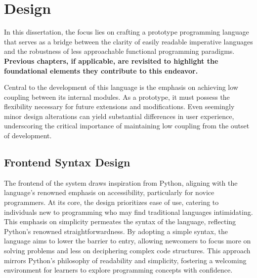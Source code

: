 \documentclass{l4proj}
\begin{document}

\chapter{Design}


In this dissertation, the focus lies on crafting a prototype programming language that serves as a bridge between the clarity of easily readable imperative languages and the robustness of less approachable functional programming paradigms.
\textbf{Previous chapters, if applicable, are revisited to highlight the foundational elements they contribute to this endeavor.}

Central to the development of this language is the emphasis on achieving low coupling between its internal modules.
As a prototype, it must possess the flexibility necessary for future extensions and modifications.
Even seemingly minor design alterations can yield substantial differences in user experience, underscoring the critical importance of maintaining low coupling from the outset of development.

\section{Frontend Syntax Design}

The frontend of the system draws inspiration from Python, aligning with the language's renowned emphasis on accessibility, particularly for novice programmers.
At its core, the design prioritizes ease of use, catering to individuals new to programming who may find traditional languages intimidating.
This emphasis on simplicity permeates the syntax of the language, reflecting Python's renowned straightforwardness.
By adopting a simple syntax, the language aims to lower the barrier to entry, allowing newcomers to focus more on solving problems and less on deciphering complex code structures.
This approach mirrors Python's philosophy of readability and simplicity, fostering a welcoming environment for learners to explore programming concepts with confidence.
\end{document}
